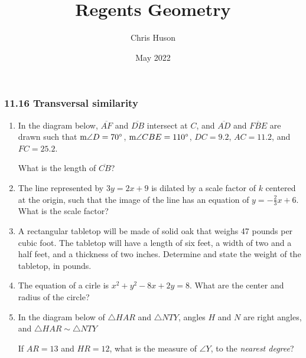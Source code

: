 \documentclass[12pt, oneside]{article}
\title{Regents Geometry}
\author{Chris Huson}
\date{May 2022}
\begin{document}
\subsubsection*{11.16 Transversal similarity}
\begin{enumerate}[itemsep=1.2cm]
\item In the diagram below, $\overline{AF}$ and $\overline{DB}$ intersect at $C$, and $\overline{AD}$ and $\overline{FBE}$ are drawn such that $\textup{m}\angle D = 70^\circ$, $\textup{m}\angle CBE = 110^\circ$, $DC=9.2$, $AC=11.2$, and $FC=25.2$.
  \begin{center}
  \end{center}
  What is the length of $\overline{CB}$?

\item The line represented by $3y=2x+9$ is dilated by a scale factor of $k$ centered at the origin, such that the image of the line has an equation of $y= - \frac{2}{3}x+6$. What is the scale factor?

\item A rectangular tabletop will be made of solid oak that weighs 47 pounds per cubic foot. The tabletop will have a length of six feet, a width of two and a half feet, and a thickness of two inches. Determine and state the weight of the tabletop, in pounds.

\item The equation of a cirle is $x^2+y^2-8x+2y=8$. What are the center and radius of the circle?

\item In the diagram below of $\triangle HAR$ and $\triangle NTY$, angles $H$ and $N$ are right angles, and $\triangle HAR \sim \triangle NTY$
\begin{center}
\end{center}
If $AR=13$ and $HR=12$, what is the measure of $\angle Y$, to the \emph{nearest degree}?


\end{enumerate}
\end{document}
